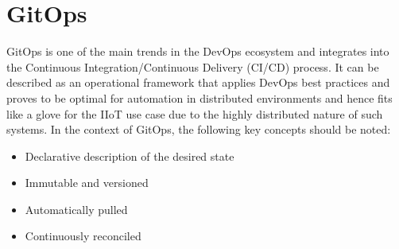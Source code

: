 \section{GitOps}
\label{section:gitops}
    GitOps is one of the main trends in the DevOps ecosystem and integrates into the Continuous Integration/Continuous Delivery (CI/CD) process. It can be described as an operational framework that applies DevOps best practices and proves to be optimal for automation in distributed environments and hence fits like a glove for the IIoT use case due to the highly distributed nature of such systems. In the context of GitOps, the following key concepts should be noted:

    \begin{itemize}
        \item Declarative description of the desired state
        \item Immutable and versioned
        \item Automatically pulled
        \item Continuously reconciled
    \end{itemize}

